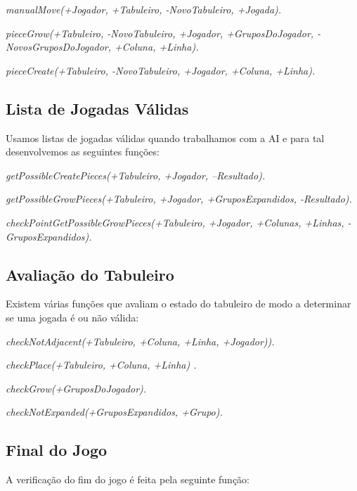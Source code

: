 \documentclass[a4paper]{article}
\begin{document}
\textit{manualMove(+Jogador, +Tabuleiro, -NovoTabuleiro, +Jogada).}

\textit{pieceGrow(+Tabuleiro, -NovoTabuleiro, +Jogador, +GruposDoJogador, -NovosGruposDoJogador, +Coluna, +Linha).}

\textit{pieceCreate(+Tabuleiro, -NovoTabuleiro, +Jogador, +Coluna, +Linha).}


 

\subsection{Lista de Jogadas Válidas} Usamos listas de jogadas válidas quando trabalhamos com a AI e para tal desenvolvemos as seguintes funções:

\textit{getPossibleCreatePieces(+Tabuleiro, +Jogador, --Resultado).}

\textit{getPossibleGrowPieces(+Tabuleiro, +Jogador, +GruposExpandidos, -Resultado).}

\textit{checkPointGetPossibleGrowPieces(+Tabuleiro, +Jogador, +Colunas, +Linhas, -GruposExpandidos).}


\subsection{Avaliação do Tabuleiro} Existem várias funções que avaliam o estado do tabuleiro de modo a determinar se uma jogada é ou não válida:

\textit{checkNotAdjacent(+Tabuleiro, +Coluna, +Linha, +Jogador)).}

\textit{checkPlace(+Tabuleiro, +Coluna, +Linha) .}

\textit{checkGrow(+GruposDoJogador).}

\textit{checkNotExpanded(+GruposExpandidos, +Grupo).}


\subsection{Final do Jogo} A verificação do fim do jogo é feita pela seguinte função:
\end{document}
